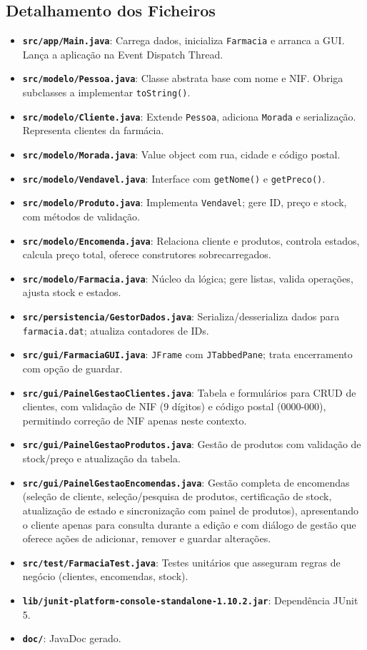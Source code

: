 \documentclass[a4paper,12pt]{article}
\begin{document}
\subsection{Detalhamento dos Ficheiros}
\begin{itemize}[leftmargin=15pt]
    \item \textbf{\texttt{src/app/Main.java}}: Carrega dados, inicializa \texttt{Farmacia} e arranca a GUI. Lança a aplicação na Event Dispatch Thread.
    \item \textbf{\texttt{src/modelo/Pessoa.java}}: Classe abstrata base com nome e NIF. Obriga subclasses a implementar \texttt{toString()}.
    \item \textbf{\texttt{src/modelo/Cliente.java}}: Extende \texttt{Pessoa}, adiciona \texttt{Morada} e serialização. Representa clientes da farmácia.
    \item \textbf{\texttt{src/modelo/Morada.java}}: Value object com rua, cidade e código postal.
    \item \textbf{\texttt{src/modelo/Vendavel.java}}: Interface com \texttt{getNome()} e \texttt{getPreco()}.
    \item \textbf{\texttt{src/modelo/Produto.java}}: Implementa \texttt{Vendavel}; gere ID, preço e stock, com métodos de validação.
    \item \textbf{\texttt{src/modelo/Encomenda.java}}: Relaciona cliente e produtos, controla estados, calcula preço total, oferece construtores sobrecarregados.
    \item \textbf{\texttt{src/modelo/Farmacia.java}}: Núcleo da lógica; gere listas, valida operações, ajusta stock e estados.
    \item \textbf{\texttt{src/persistencia/GestorDados.java}}: Serializa/desserializa dados para \texttt{farmacia.dat}; atualiza contadores de IDs.
    \item \textbf{\texttt{src/gui/FarmaciaGUI.java}}: \texttt{JFrame} com \texttt{JTabbedPane}; trata encerramento com opção de guardar.
    \item \textbf{\texttt{src/gui/PainelGestaoClientes.java}}: Tabela e formulários para CRUD de clientes, com validação de NIF (9 dígitos) e código postal (0000-000), permitindo correção de NIF apenas neste contexto.
    \item \textbf{\texttt{src/gui/PainelGestaoProdutos.java}}: Gestão de produtos com validação de stock/preço e atualização da tabela.
    \item \textbf{\texttt{src/gui/PainelGestaoEncomendas.java}}: Gestão completa de encomendas (seleção de cliente, seleção/pesquisa de produtos, certificação de stock, atualização de estado e sincronização com painel de produtos), apresentando o cliente apenas para consulta durante a edição e com diálogo de gestão que oferece ações de adicionar, remover e guardar alterações.
    \item \textbf{\texttt{src/test/FarmaciaTest.java}}: Testes unitários que asseguram regras de negócio (clientes, encomendas, stock).
    \item \textbf{\texttt{lib/junit-platform-console-standalone-1.10.2.jar}}: Dependência JUnit 5.
    \item \textbf{\texttt{doc/}}: JavaDoc gerado.
\end{itemize}
\end{document}
